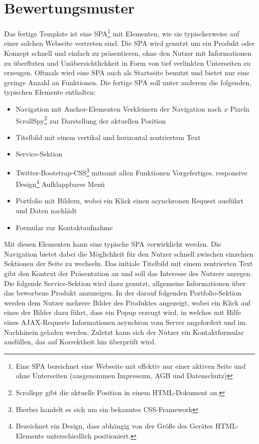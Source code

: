 \section{Bewertungsmuster}
\label{sec:Bewertungsmuster}
Das fertige Template ist eine \ac{SPA}\footnote{Eine \ac{SPA} bezeichnet eine Webseite mit effektiv nur einer aktiven Seite und ohne Unterseiten (ausgenommen Impressum, AGB und Datenschutz)} mit Elementen, wie sie typischerweise auf einer solchen Webseite vertreten sind. Die \ac{SPA} wird genutzt um ein Produkt oder Konzept schnell und einfach zu präsentieren, ohne den Nutzer mit Informationen zu überfluten und Unübersichtlichkeit in Form von tief verlinkten Unterseiten zu erzeugen. Oftmals wird eine SPA auch als Startseite benutzt und bietet nur eine geringe Anzahl an Funktionen.
Die fertige \ac{SPA} soll unter anderem die folgenden, typischen Elemente enthalten:
\begin{itemize}
	\item Navigation mit Anchor-Elementen
	\subitem{-} Verkleinern der Navigation nach $x$ Pixeln
	\subitem{-} ScrollSpy\footnote{Scrollspy gibt die aktuelle Position in einem \ac{HTML}-Dokument an.} zur Darstellung der aktuellen Position
	\item Titelbild mit einem vertikal und horizontal zentriertem Text
	\item Service-Sektion
	\item Twitter-Bootstrap-\ac{CSS}\footnote{Hierbei handelt es sich um ein bekanntes \ac{CSS}-Framework} mitsamt allen Funktionen
	\subitem{-} Vorgefertiges, responsive Design\footnote{Bezeichnet ein Design, dass abhängig von der Größe des Gerätes \ac{HTML}-Elemente unterschiedlich positioniert.}
	\subitem{-} Aufklappbares Menü
	\item Portfolio mit Bildern, wobei ein Klick einen asynchronen Request ausführt und Daten nachlädt
	\item Formular zur Kontaktaufnahme
\end{itemize}
Mit diesen Elementen kann eine typische SPA verwirklicht werden. Die Navigation bietet dabei die Möglichkeit für den Nutzer schnell zwischen einzelnen Sektionen der Seite zu wechseln. Das initiale Titelbild mit einem zentrierten Text gibt den Kontext der Präsentation an und soll das Interesse des Nutzers anregen. Die folgende Service-Sektion wird dazu genutzt, allgemeine Informationen über das beworbene Produkt anzuzeigen. In der darauf folgenden Portfolio-Sektion werden dem Nutzer mehrere Bilder des Produktes angezeigt, wobei ein Klick auf eines der Bilder dazu führt, dass ein Popup erzeugt wird, in welches mit Hilfe eines AJAX-Requests Informationen asynchron vom Server angefordert und im Nachhinein geladen werden. Zuletzt kann sich der Nutzer ein Kontaktformular ausfüllen, das auf Korrektheit hin überprüft wird.


